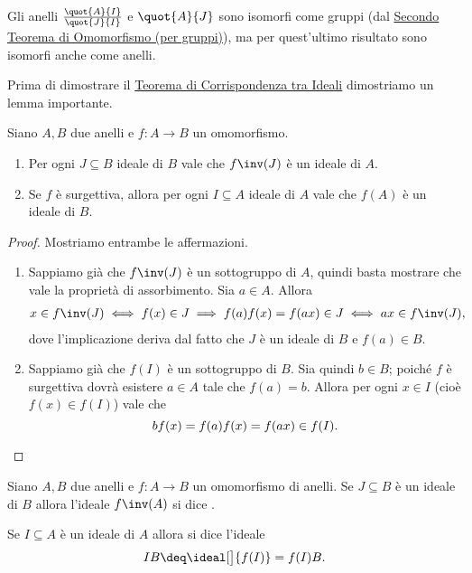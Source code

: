 \begin{remark}
    Gli anelli $\frac{\quot{A}{I}}{\quot{J}{I}}$ e $\quot{A}{J}$ sono isomorfi come gruppi (dal \hyperref[th:second_iso]{Secondo Teorema di Omomorfismo (per gruppi)}), ma per quest'ultimo risultato sono isomorfi anche come anelli.
\end{remark}

Prima di dimostrare il \hyperref[th:ideal_corr]{Teorema di Corrispondenza tra Ideali} dimostriamo un lemma importante.
\begin{lemma}
    \label{lem:ideals_and_homos}
    Siano $A, B$ due anelli e $f : A \to B$ un omomorfismo.
    \begin{enumerate}[label={(\arabic*)}]
        \item Per ogni $J \subseteq B$ ideale di $B$ vale che $f\inv(J)$ è un ideale di $A$.
        \item Se $f$ è surgettiva, allora per ogni $I \subseteq A$ ideale di $A$ vale che $f(A)$ è un ideale di $B$.
    \end{enumerate}
\end{lemma}
\begin{proof}
    Mostriamo entrambe le affermazioni.
    \begin{enumerate}[label={(\arabic*)}]
        \item Sappiamo già che $f\inv(J)$ è un sottogruppo di $A$, quindi basta mostrare che vale la proprietà di assorbimento. Sia $a \in A$. Allora \begin{align*}
            x \in f\inv(J) %
            \iff f(x) \in J %
            \implies f(a)f(x) = f(ax) \in J %
            \iff ax \in f\inv(J),
        \end{align*} dove l'implicazione deriva dal fatto che $J$ è un ideale di $B$ e $f(a) \in B$.
        \item Sappiamo già che $f(I)$ è un sottogruppo di $B$. Sia quindi $b \in B$; poiché $f$ è surgettiva dovrà esistere $a \in A$ tale che $f(a) = b$. Allora per ogni $x \in I$ (cioè $f(x) \in f(I)$) vale che \[
            bf(x) = f(a)f(x) = f(ax) \in f(I). \qedhere    
        \]
    \end{enumerate}
\end{proof}

\begin{definition}
    Siano $A, B$ due anelli e $f : A \to B$ un omomorfismo di anelli. Se $J \subseteq B$ è un ideale di $B$ allora l'ideale $f\inv(A)$ si dice .
    
    Se $I \subseteq A$ è un ideale di $A$ allora si dice  l'ideale \[
        IB \deq \ideal[\big]{f(I)} = f(I)B.    
    \]
\end{definition}

